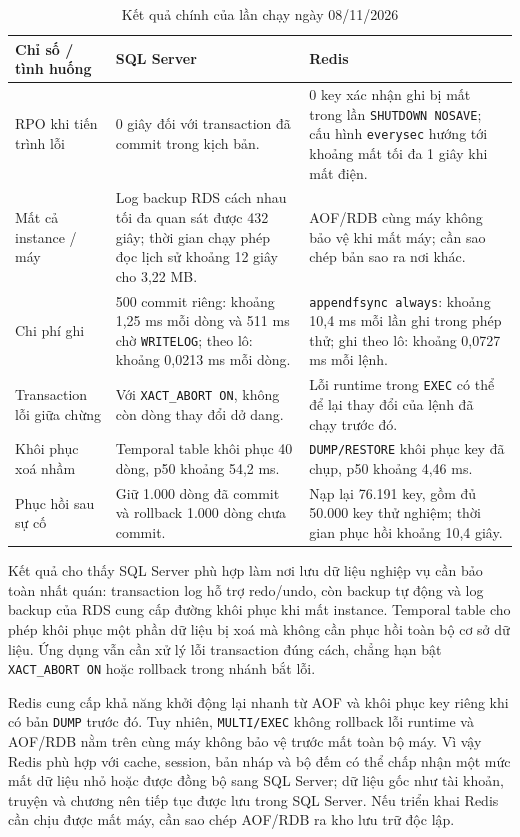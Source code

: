 \begin{table}[H]
\centering
\small
\begin{tabularx}{\textwidth}{|p{}|X|X|}
\hline
\textbf{Chỉ số / tình huống} & \textbf{SQL Server} & \textbf{Redis} \\ \hline
RPO khi tiến trình lỗi & 0 giây đối với transaction đã commit trong kịch bản. & 0 key xác nhận ghi bị mất trong lần \texttt{SHUTDOWN NOSAVE}; cấu hình \texttt{everysec} hướng tới khoảng mất tối đa 1 giây khi mất điện. \\ \hline
Mất cả instance / máy & Log backup RDS cách nhau tối đa quan sát được 432 giây; thời gian chạy phép đọc lịch sử khoảng 12 giây cho 3,22 MB. & AOF/RDB cùng máy không bảo vệ khi mất máy; cần sao chép bản sao ra nơi khác. \\ \hline
Chi phí ghi & 500 commit riêng: khoảng 1,25 ms mỗi dòng và 511 ms chờ \texttt{WRITELOG}; theo lô: khoảng 0,0213 ms mỗi dòng. & \texttt{appendfsync always}: khoảng 10,4 ms mỗi lần ghi trong phép thử; ghi theo lô: khoảng 0,0727 ms mỗi lệnh. \\ \hline
Transaction lỗi giữa chừng & Với \texttt{XACT\_ABORT ON}, không còn dòng thay đổi dở dang. & Lỗi runtime trong \texttt{EXEC} có thể để lại thay đổi của lệnh đã chạy trước đó. \\ \hline
Khôi phục xoá nhầm & Temporal table khôi phục 40 dòng, p50 khoảng 54,2 ms. & \texttt{DUMP/RESTORE} khôi phục key đã chụp, p50 khoảng 4,46 ms. \\ \hline
Phục hồi sau sự cố & Giữ 1.000 dòng đã commit và rollback 1.000 dòng chưa commit. & Nạp lại 76.191 key, gồm đủ 50.000 key thử nghiệm; thời gian phục hồi khoảng 10,4 giây. \\ \hline
\end{tabularx}
\caption{Kết quả chính của lần chạy ngày 08/11/2026}
\label{tab:backup-recovery-results}
\end{table}

Kết quả cho thấy SQL Server phù hợp làm nơi lưu dữ liệu nghiệp vụ cần bảo toàn nhất quán: transaction log hỗ trợ redo/undo, còn backup tự động và log backup của RDS cung cấp đường khôi phục khi mất instance. Temporal table cho phép khôi phục một phần dữ liệu bị xoá mà không cần phục hồi toàn bộ cơ sở dữ liệu. Ứng dụng vẫn cần xử lý lỗi transaction đúng cách, chẳng hạn bật \texttt{XACT\_ABORT ON} hoặc rollback trong nhánh bắt lỗi.

Redis cung cấp khả năng khởi động lại nhanh từ AOF và khôi phục key riêng khi có bản \texttt{DUMP} trước đó. Tuy nhiên, \texttt{MULTI/EXEC} không rollback lỗi runtime và AOF/RDB nằm trên cùng máy không bảo vệ trước mất toàn bộ máy. Vì vậy Redis phù hợp với cache, session, bản nháp và bộ đếm có thể chấp nhận một mức mất dữ liệu nhỏ hoặc được đồng bộ sang SQL Server; dữ liệu gốc như tài khoản, truyện và chương nên tiếp tục được lưu trong SQL Server. Nếu triển khai Redis cần chịu được mất máy, cần sao chép AOF/RDB ra kho lưu trữ độc lập.

